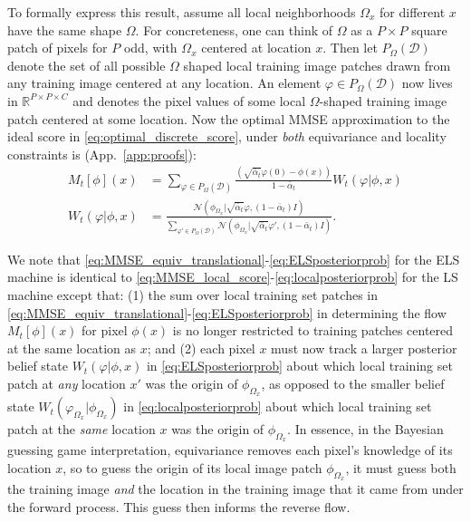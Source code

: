 \documentclass{article}
\theoremstyle{plain}
\theoremstyle{definition}
\theoremstyle{remark}
\begin{document}
To formally express this result, assume all local neighborhoods $\Omega_x$ for different $x$ have the same shape $\Omega$.  For concreteness, one can think of $\Omega$ as a $P \times P$ square patch of pixels for $P$ odd, with $\Omega_x$ centered at location $x$.  Then let $P_{\Omega}(\mathcal{D})$ denote the set of all possible $\Omega$ shaped local training image patches drawn from any training image centered at any location.  An element $\varphi \in P_{\Omega}(\mathcal{D})$ now lives in $\mathbb{R}^{P \times P \times C}$ and denotes the pixel values of some local $\Omega$-shaped training image patch centered at some location. Now the optimal MMSE approximation to the ideal score in \eqref{eq:optimal_discrete_score}, under {\it both} equivariance and locality constraints is (App.~\ref{app:proofs}):     
\begin{align}
\label{eq:MMSE_equiv_translational}
    M_t[\phi](x) &= \sum_{\varphi \in P_\Omega(\mathcal{D})} \frac{(\sqrt{\bar{\alpha}_t} \varphi(0)-\phi(x))}{1 - \bar{\alpha}_t}W_t(\varphi|\phi, x)\\
    \label{eq:ELSposteriorprob}
    W_t(\varphi|\phi,x) &= \frac{\mathcal{N}(\phi_{\Omega_x}|\sqrt{\bar{\alpha}_t} \varphi, (1 - \bar{\alpha}_t)I)}{\sum_{\varphi' \in P_{\Omega}(\mathcal{D})}  \mathcal{N}(\phi_{\Omega_x}|\sqrt{\bar{\alpha}_t} \varphi', (1 - \bar{\alpha}_t) I)}.
\end{align}

We note that \eqref{eq:MMSE_equiv_translational}-\eqref{eq:ELSposteriorprob} for the ELS machine is identical to \eqref{eq:MMSE_local_score}-\eqref{eq:localposteriorprob} for the LS machine except that: (1) the sum over local training set patches in \eqref{eq:MMSE_equiv_translational}-\eqref{eq:ELSposteriorprob} in determining the flow $M_t[\phi](x)$ for pixel $\phi(x)$ is no longer restricted to training patches centered at the same location as $x$; and (2) each pixel $x$ must now track a larger posterior belief state $W_t(\varphi|\phi,x)$ in \eqref{eq:ELSposteriorprob} about which local training set patch at {\it any} location $x'$ was the origin of $\phi_{\Omega_x}$, as opposed to the smaller belief state $W_t(\varphi_{\Omega_x}|\phi_{\Omega_x})$ in \eqref{eq:localposteriorprob} about which local training set patch at the {\it same} location $x$ was the origin of $\phi_{\Omega_x}$.  In essence, in the Bayesian guessing game interpretation, equivariance removes each pixel's knowledge of its location $x$, so to guess the origin of its local image patch $\phi_{\Omega_x}$, it must guess both the training image {\it and} the location in the training image that it came from under the forward process. This guess then informs the reverse flow.  
\end{document}
